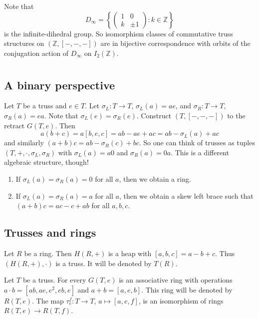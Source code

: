 \documentclass{svmult}
\newcommand{\Z}{\mathbb{Z}}
\begin{document}
Note that
\[
D_\infty=\left\{\begin{pmatrix}
1&0\\k&\pm 1
\end{pmatrix}:k\in\Z\right\}
\]
is the infinite-dihedral group. So isomorphism classes
of commutative truss structures on 
$\left(\Z,[-,-,-]\right)$ are in bijective correspondence with orbits of the conjugation 
action of $D_\infty$ on $I_2(\Z)$. 

\section{}

\subsection{A binary perspective}

Let $T$ be a truss and $e\in T$. Let $\sigma_L\colon T\to T$, $\sigma_L(a)=ae$, and 
$\sigma_R\colon T\to T$, $\sigma_R(a)=ea$. Note that $\sigma_L(e)=\sigma_R(e)$. 
Construct $\left(T,[-,-,-]\right)$ to the retract $G(T,e)$. Then
\[
a(b+c)=a[b,e,c]=ab-ae+ac=ab-\sigma_L(a)+ac
\]
and similarly $(a+b)c=ab-\sigma_R(c)+bc$. So one can think of trusses
as tuples $(T,+,\cdot,\sigma_L,\sigma_R)$ with 
$\sigma_L(a)=a0$ and $\sigma_R(a)=0a$. This is a different algebraic structure, though! 
\begin{enumerate}
    \item If $\sigma_L(a)=\sigma_R(a)=0$ for all $a$, then we obtain a ring. 
    \item If $\sigma_L(a)=\sigma_R(a)=a$ for all $a$, then we obtain a 
        skew left brace such that 
        $(a+b)c=ac-c+ab$ for all $a,b,c$.
\end{enumerate}

\subsection{Trusses and rings}

\begin{example}
    Let $R$ be a ring. Then $H(R,+)$ is a heap with $[a,b,c]=a-b+c$. Thus 
    $\left(H(R,+),\cdot\right)$ is a truss. It will be denoted by $T(R)$. 
\end{example}

\begin{theorem}
\label{thm:ring}
    Let $T$ be a truss. For every $G(T,e)$ is an associative
    ring with operations $a\cdot b=[ab,ae,e^2,eb,e]$
    and $a+b=[a,e,b]$. 
    This ring will be denoted by $R(T,e)$. 
    The map 
    $\tau_e^f\colon T\to T$, $a\mapsto [a,e,f]$, is an isomorphism of rings 
    $R(T,e)\to R(T,f)$. 
\end{theorem}
\end{document}
